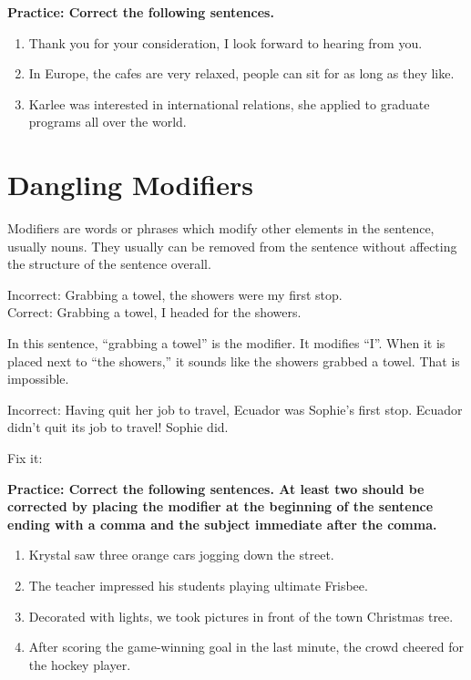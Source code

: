 \bigskip
\textbf{Practice: Correct the following sentences. }
\begin{enumerate}
\item{Thank you for your consideration, I look forward to hearing from you.}
\item{In Europe, the cafes are very relaxed, people can sit for as long as they like.}
\item{Karlee was interested in international relations, she applied to graduate programs all over the world.}
\end{enumerate}

\section{Dangling Modifiers} 
Modifiers are words or phrases which modify other elements in the sentence, usually nouns.  They usually can be removed from the sentence without affecting the structure of the sentence overall.

\bigskip
Incorrect: Grabbing a towel, the showers were my first stop. \\
Correct: Grabbing a towel, I headed for the showers. 

\bigskip
In this sentence, “grabbing a towel” is the modifier.  It modifies “I”.  When it is placed next to “the showers,” it sounds like the showers grabbed a towel.  That is impossible.

\bigskip
Incorrect: Having quit her job to travel, Ecuador was Sophie's first stop.  Ecuador didn't quit its job to travel!  Sophie did.

\bigskip
Fix it: \hrulefill


\bigskip
\textbf{Practice: Correct the following sentences. At least two should be corrected by placing the modifier at the beginning of the sentence ending with a comma and the subject immediate after the comma.}

\begin{enumerate}
\item{Krystal saw three orange cars jogging down the street.}

\item{The teacher impressed his students playing ultimate Frisbee.}

\item{Decorated with lights, we took pictures in front of the town Christmas tree.} 


\item{After scoring the game-winning goal in the last minute, the crowd cheered for the hockey player.}
\end{enumerate}

